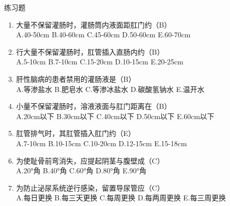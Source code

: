 \documentclass[11pt, a4paper]{ctexart}
\begin{document}
\begin{examplebox}{练习题}
\begin{enumerate}
    \item 大量不保留灌肠时，灌肠筒内液面距肛门约（B）\\
    A.40-50cm \quad B.40-60cm \quad C.45-60cm \quad D.50-60cm \quad E.60-70cm
    \item 行大量不保留灌肠时，肛管插入直肠内约（B）\\
    A.5-10cm \quad B.7-10cm \quad C.15-20cm \quad D.10-15cm \quad E.20-25cm
    \item 肝性脑病的患者禁用的灌肠液是（B）\\
    A.等渗盐水 \quad B.肥皂水 \quad C.等渗冰盐水 \quad D.碳酸氢钠水 \quad E.温开水
    \item 小量不保留灌肠时，溶液液面与肛门距离在（B）\\
    A.20cm以下 \quad B.30cm以下 \quad C.40cm以下 \quad D.50cm以下 \quad E.60cm以下
    \item 肛管排气时，其肛管插入肛门约（E）\\
    A.7-10cm \quad B.10-15cm \quad C.10-20cm \quad D.12-15cm \quad E.15-18cm
    \item 为使耻骨前弯消失，应提起阴茎与腹壁成（C）\\
    A.20°角 \quad B.40°角 \quad C.60°角 \quad D.80°角 \quad E.90°角
    \item 为防止泌尿系统逆行感染，留置导尿管应（C）\\
    A.每日更换 \quad B.每三天更换 \quad C.每周更换 \quad D.每两周更换 \quad E.每三周更换
\end{enumerate}
\end{examplebox}
\end{document}
